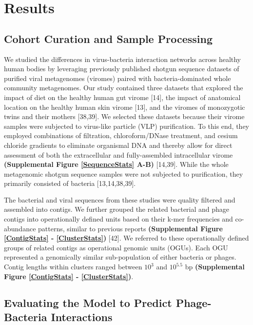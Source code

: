 \documentclass[12pt,]{article}
\begin{document}
\section{Results}\label{results}

\subsection{Cohort Curation and Sample
Processing}\label{cohort-curation-and-sample-processing}

We studied the differences in virus-bacteria interaction networks across
healthy human bodies by leveraging previously published shotgun sequence
datasets of purified viral metagenomes (viromes) paired with
bacteria-dominated whole community metagenomes. Our study contained
three datasets that explored the impact of diet on the healthy human gut
virome {[}14{]}, the impact of anatomical location on the healthy human
skin virome {[}13{]}, and the viromes of monozygotic twins and their
mothers {[}38,39{]}. We selected these datasets because their virome
samples were subjected to virus-like particle (VLP) purification. To
this end, they employed combinations of filtration, chloroform/DNase
treatment, and cesium chloride gradients to eliminate organismal DNA and
thereby allow for direct assessment of both the extracellular and
fully-assembled intracellular virome \textbf{(Supplemental Figure
\ref{SequenceStats} A-B)} {[}14,39{]}. While the whole metagenomic
shotgun sequence samples were not subjected to purification, they
primarily consisted of bacteria {[}13,14,38,39{]}.

The bacterial and viral sequences from these studies were quality
filtered and assembled into contigs. We further grouped the related
bacterial and phage contigs into operationally defined units based on
their k-mer frequencies and co-abundance patterns, similar to previous
reports \textbf{(Supplemental Figure \ref{ContigStats} -
\ref{ClusterStats})} {[}42{]}. We referred to these operationally
defined groups of related contigs as operational genomic units (OGUs).
Each OGU represented a genomically similar sub-population of either
bacteria or phages. Contig lengths within clusters ranged between
\(10^{3}\) and \(10^{5.5}\) bp \textbf{(Supplemental Figure
\ref{ContigStats} - \ref{ClusterStats})}.

\subsection{Evaluating the Model to Predict Phage-Bacteria
Interactions}\label{evaluating-the-model-to-predict-phage-bacteria-interactions}
\end{document}
